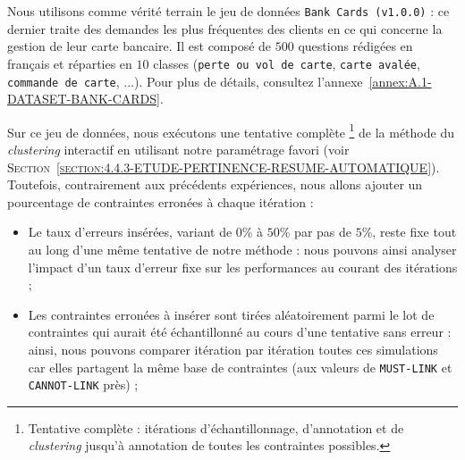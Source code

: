 			Nous utilisons comme vérité terrain le jeu de données \texttt{Bank Cards (v1.0.0)} : ce dernier traite des demandes les plus fréquentes des clients en ce qui concerne la gestion de leur carte bancaire.
			Il est composé de $500$ questions rédigées en français et réparties en $10$ classes (\texttt{perte ou vol de carte}, \texttt{carte avalée}, \texttt{commande de carte}, ...).
			Pour plus de détails, consultez l'annexe~\ref{annex:A.1-DATASET-BANK-CARDS}.
			
			Sur ce jeu de données, nous exécutons une tentative complète
			\footnote{Tentative complète : itérations d'échantillonnage, d'annotation et de \textit{clustering} jusqu'à annotation de toutes les contraintes possibles.}
			de la méthode du \textit{clustering} interactif en utilisant notre paramétrage favori (voir \textsc{Section~\ref{section:4.4.3-ETUDE-PERTINENCE-RESUME-AUTOMATIQUE}}).
			Toutefois, contrairement aux précédents expériences, nous allons ajouter un pourcentage de contraintes erronées à chaque itération :
			\begin{itemize}
				\item Le taux d'erreurs insérées, variant de $0$\% à $50$\% par pas de $5$\%, reste fixe tout au long d'une même tentative de notre méthode : nous pouvons ainsi analyser l'impact d'un taux d'erreur fixe sur les performances au courant des itérations ;
				\item Les contraintes erronées à insérer sont tirées aléatoirement parmi le lot de contraintes qui aurait été échantillonné au cours d'une tentative sans erreur : ainsi, nous pouvons comparer itération par itération toutes ces simulations car elles partagent la même base de contraintes (aux valeurs de \texttt{MUST-LINK} et \texttt{CANNOT-LINK} près) ;
			\end{itemize}
			
